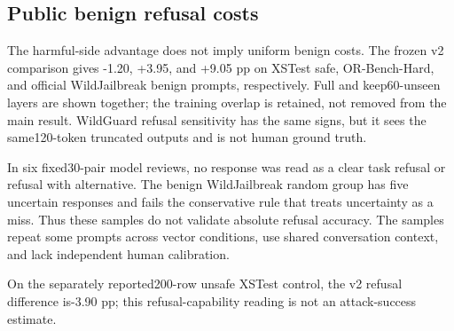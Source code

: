 \subsection{Public benign refusal costs}

The harmful-side advantage does not imply uniform benign costs. The frozen v2 comparison gives -1.20, +3.95, and +9.05 pp on XSTest safe, OR-Bench-Hard, and official WildJailbreak benign prompts, respectively. Full and keep60-unseen layers are shown together; the training overlap is retained, not removed from the main result. WildGuard refusal sensitivity has the same signs, but it sees the same120-token truncated outputs and is not human ground truth.

In six fixed30-pair model reviews, no response was read as a clear task refusal or refusal with alternative. The benign WildJailbreak random group has five uncertain responses and fails the conservative rule that treats uncertainty as a miss. Thus these samples do not validate absolute refusal accuracy. The samples repeat some prompts across vector conditions, use shared conversation context, and lack independent human calibration.

On the separately reported200-row unsafe XSTest control, the v2 refusal difference is-3.90 pp; this refusal-capability reading is not an attack-success estimate.

